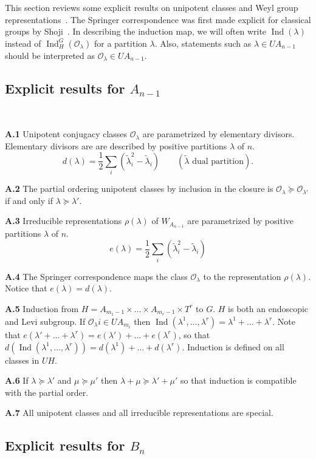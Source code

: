 \documentclass{amsart}
\newcommand\Amone[1]{A_{m_{#1}-1}}
\newcommand\Ilams	{\Ind(\lam^1,\dots,\lam^r)}
\newcommand\Ind	{\operatorname{Ind}}
\newcommand\lam	{\lambda}
\newcommand\lamtil	{\tilde\lambda}
\newcommand\cO		{{\mathcal O}}
\newcommand\sumlam[1]{\sum_{#1} (\tilde\lam_i^2 - \tilde\lambda_i)}
\begin{document}
This section reviews some explicit results on unipotent classes and Weyl group
representations~\cites{C,Sp}.  The Springer correspondence was first
made explicit for classical groups by Shoji~\cite{Sh1}.  In describing the
induction map, we will often write $\Ind (\lam)$ instead of 
$\Ind_H^G(\cO_\lam)$ for a partition $\lam$.  Also, statements such as
$\lam \in UA_{n-1}$ should be interpreted as $\cO_\lam \in UA_{n-1}$.

\bigskip
\subsection{Explicit results for $A_{n-1}$}~\newline

\noindent
{\bf A.1} \qquad Unipotent conjugacy classes $\cO_\lam$ are parametrized by 
elementary divisors.  Elementary divisors are are described by positive
partitions $\lam$ of $n$.
	$$
	d(\lam) = \frac 12 \sumlam{i} \qquad
	(\lamtil \text{ dual partition}).
	$$

\noindent
{\bf A.2} \qquad The partial ordering unipotent classes by inclusion in the 
closure is $\cO_\lam \succeq \cO_{\lam'}$ if and only if $\lam \succeq \lam'$.

\noindent
{\bf A.3} \qquad Irreducible representations $\rho(\lam)$ of $W_{A_{n-1}}$ are parametrized
by positive partitions $\lam$ of $n$.
	$$
	e(\lam) = \frac 12 \sumlam{i}
	$$

\noindent
{\bf A.4} \qquad The Springer correspondence maps the class $\cO_\lam$ to the 
representation $\rho(\lam)$.  Notice that $e(\lam) = d(\lam)$.

\noindent
{\bf A.5} \qquad Induction from 
$H = \Amone 1 \times \dots \times \Amone r \times T^r$ to $G$.  $H$ is
both an endoscopic and Levi subgroup.  If $\cO_\lam i \in UA_{m_i}$ then
$\Ilams = \lam^1 + \dots + \lam^r$.  
Note that $e(\lam' + \dots + \lam^r) = e(\lam')+\dots+ e(\lam^r)$,
so that $d(\Ilams) = d(\lam^1)+\dots+d(\lam^r)$.  Induction is defined on all
classes in $UH$.

\noindent
{\bf A.6} \qquad If $\lam \succeq \lam'$ and $\mu \succeq \mu'$ then 
$\lam + \mu \succeq \lam' + \mu'$ so that induction is compatible with
the partial order.

\noindent
{\bf A.7} \qquad All unipotent classes and all irreducible representations 
are special.

\bigskip
\subsection{Explicit results for $B_n$}~\newline
\end{document}
